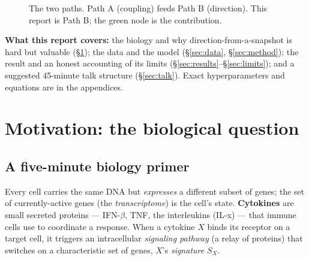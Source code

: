 \documentclass[11pt]{article}
\newcommand{\code}[1]{\texttt{\small #1}}
\newcommand{\cross}{\code{cross\_asym}}
\newcommand{\Sx}{\ensuremath{S_X}}
\begin{document}
\begin{figure}[h]\centering
{}
\caption{The two paths. Path A (coupling) feeds Path B (direction). This report
is Path B; the green node is the contribution.}\label{fig:f1}
\end{figure}

\textbf{What this report covers:} the biology and why direction-from-a-snapshot is
hard but valuable (§\ref{sec:motiv}); the data and the model (§\ref{sec:data},
§\ref{sec:method}); the result and an honest accounting of its limits
(§\ref{sec:results}--§\ref{sec:limits}); and a suggested 45-minute talk structure
(§\ref{sec:talk}). Exact hyperparameters and equations are in the appendices.

\section{Motivation: the biological question}\label{sec:motiv}

\subsection{A five-minute biology primer}
Every cell carries the same DNA but \emph{expresses} a different subset of genes;
the set of currently-active genes (the \emph{transcriptome}) is the cell's state.
\textbf{Cytokines} are small secreted proteins --- IFN-$\beta$, TNF, the
interleukins (IL-x) --- that immune cells use to coordinate a response. When a
cytokine $X$ binds its receptor on a target cell, it triggers an intracellular
\emph{signaling pathway} (a relay of proteins) that switches on a characteristic
set of genes, $X$'s \emph{signature} \Sx{}.
\end{document}
